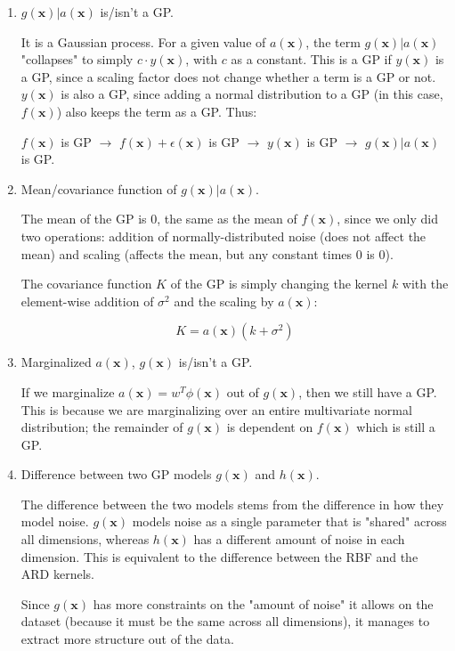 \documentclass[11pt]{article}
\newcommand{\mbf}[1]{{\boldsymbol{\mathbf{#1}}}}
\renewcommand{\bm}{\mbf}
\begin{document}
\begin{enumerate}[label=\textbf{\alph*.}]
    
    \item $g(\bm{x})|a(\bm{x})$ is/isn't a GP.

        It is a Gaussian process. For a given value of $a(\bm{x})$, the term $g(\bm{x})|a(\bm{x})$ "collapses" to simply $c \cdot y(\bm{x})$, with $c$ as a constant. This is a GP if $y(\bm{x})$ is a GP, since a scaling factor does not change whether a term is a GP or not. $y(\bm{x})$ is also a GP, since adding a normal distribution to a GP (in  this case, $f(\bm{x})$) also keeps the term as a GP. Thus:

        $f(\bm{x})$ is GP $\rightarrow$ $f(\bm{x}) + \epsilon (\bm{x})$ is GP $\rightarrow$ $y(\bm{x})$ is GP $\rightarrow$ $g(\bm{x})|a(\bm{x})$ is GP.

    \item Mean/covariance function of $g(\bm{x})|a(\bm{x})$.

        The mean of the GP is $0$, the same as the mean of $f(\bm{x})$, since we only did two operations: addition of normally-distributed noise (does not affect the mean) and scaling (affects the mean, but any constant times $0$ is $0$).

        The covariance function $K$ of the GP is simply changing the kernel $k$ with the element-wise addition of $\sigma^2$ and the scaling by $a(\bm{x})$:

        $$
        K = a(\bm{x})(k + \sigma^2)
        $$

    \item Marginalized $a(\bm{x})$, $g(\bm{x})$ is/isn't a GP.

        If we marginalize $a(\bm{x}) = w^T \phi(\bm{x})$ out of $g(\bm{x})$, then we still have a GP. This is because we are marginalizing over an entire multivariate normal distribution; the remainder of $g(\bm{x})$ is dependent on $f(\bm{x})$ which is still a GP.

    \item Difference between two GP models $g(\bm{x})$ and $h(\bm{x})$.

        The difference between the two models stems from the difference in how they model noise. $g(\bm{x})$ models noise as a single parameter that is "shared" across all dimensions, whereas $h(\bm{x})$ has a different amount of noise in each dimension. This is equivalent to the difference between the RBF and the ARD kernels.

        Since $g(\bm{x})$ has more constraints on the "amount of noise" it allows on the dataset (because it must be the same across all dimensions), it manages to extract more structure out of the data.

\end{enumerate}
\end{document}
